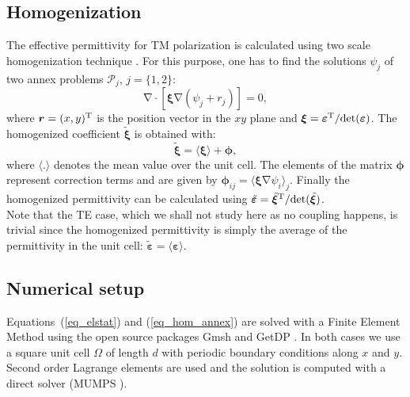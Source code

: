 \documentclass[openacc]{rsproca_new}%
\newcommand{\B}{\boldsymbol}
\newcommand{\tens}[1]{\B{#1}}
\newcommand{\grad}{\B{\mathrm{\nabla}}}
\renewcommand{\div}{\B{\mathrm{\nabla\cdotp}}}
\newcommand{\epstens}{\tens{\varepsilon}}
\newcommand{\epshom}{\tilde{\epstens}}
\newcommand{\xitens}{\tens{\xi}}
\newcommand{\xihom}{\tilde{\xitens}}
\begin{document}
\subsection{Homogenization}
The effective permittivity for TM polarization is calculated
using two scale homogenization technique \cite{allaire_homogenization_1992, guenneau_homogenization_2000}.
For this purpose, one has to find the solutions
$\psi_j$ of two annex problems $\mathcal P_j$, $j=\{1, 2\}$:
\begin{equation}
\div \left[ \xitens \grad(\psi_j + r_j) \right] = 0,
\label{eq_hom_annex}
\end{equation}
where $\B r = (x, y)^{\rm T}$ is the position vector in the $xy$ plane and
$\xitens=\epstens^{\rm T}/ {\rm det }(\epstens)$.
The homogenized coefficient $\xihom$ is obtained with:
\begin{equation}
\xihom = \langle \xitens \rangle + \B \phi,
\label{eq_hom}
\end{equation}
where $\langle . \rangle$ denotes the mean value over the unit cell.
The elements of the matrix $\B \phi$ represent correction terms and
are given by $\B \phi_{ij} = \langle \xitens \grad \psi_i \rangle_j$.
Finally the homogenized permittivity  can be calculated using $\epshom=\xihom^{\rm T}/ {\rm det }(\xihom)$.\\
Note that the TE case, which we shall not study here as no coupling happens, is trivial since
the homogenized permittivity is simply the average of the permittivity in the unit cell:
$\epshom = \langle \epstens \rangle$.


\subsection{Numerical setup}
Equations~(\ref{eq_elstat}) and (\ref{eq_hom_annex}) are solved with a Finite Element
Method using the open source packages Gmsh \cite{geuzaine_gmsh:_2009} and GetDP \cite{dular_general_1998}.
In both cases we use a square unit cell $\Omega$ of length $d$ with periodic boundary
conditions along $x$ and $y$. Second order Lagrange elements are used and the
solution is computed with a direct solver (MUMPS \cite{amestoy_fully_2001}).


\end{document}
